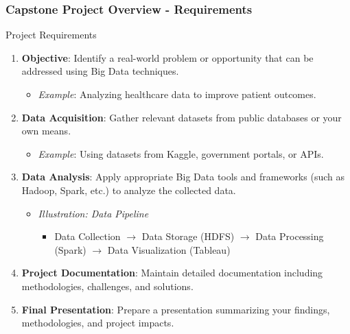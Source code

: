 \documentclass[aspectratio=169]{beamer}
\begin{document}
\begin{frame}[fragile]
    \frametitle{Capstone Project Overview - Requirements}
    \begin{block}{Project Requirements}
        \begin{enumerate}
            \item \textbf{Objective}: Identify a real-world problem or opportunity that can be addressed using Big Data techniques. 
                \begin{itemize}
                    \item \textit{Example}: Analyzing healthcare data to improve patient outcomes.
                \end{itemize}
                
            \item \textbf{Data Acquisition}: Gather relevant datasets from public databases or your own means.
                \begin{itemize}
                    \item \textit{Example}: Using datasets from Kaggle, government portals, or APIs.
                \end{itemize}
                
            \item \textbf{Data Analysis}: Apply appropriate Big Data tools and frameworks (such as Hadoop, Spark, etc.) to analyze the collected data.
                \begin{itemize}
                    \item \textit{Illustration: Data Pipeline}
                    \begin{itemize}
                        \item Data Collection $\rightarrow$ Data Storage (HDFS) $\rightarrow$ Data Processing (Spark) $\rightarrow$ Data Visualization (Tableau)
                    \end{itemize}
                \end{itemize}
                
            \item \textbf{Project Documentation}: Maintain detailed documentation including methodologies, challenges, and solutions.
            \item \textbf{Final Presentation}: Prepare a presentation summarizing your findings, methodologies, and project impacts.
        \end{enumerate}
    \end{block}
\end{frame}
\end{document}

